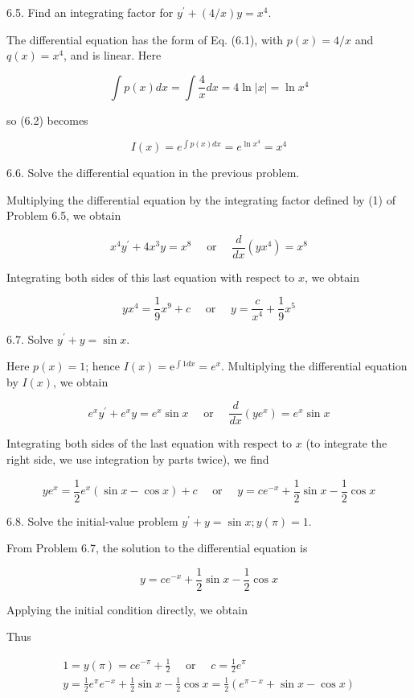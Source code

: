 \documentclass[10pt]{article}
\begin{document}
6.5. Find an integrating factor for $y^{\prime}+(4 / x) y=x^{4}$.

The differential equation has the form of Eq. (6.1), with $p(x)=4 / x$ and $q(x)=x^{4}$, and is linear. Here

$$
\int p(x) d x=\int \frac{4}{x} d x=4 \ln |x|=\ln x^{4}
$$

so (6.2) becomes


\begin{equation*}
I(x)=e^{\int p(x) d x}=e^{\ln x^{4}}=x^{4} \tag{1}
\end{equation*}


6.6. Solve the differential equation in the previous problem.

Multiplying the differential equation by the integrating factor defined by (1) of Problem 6.5, we obtain

$$
x^{4} y^{\prime}+4 x^{3} y=x^{8} \quad \text { or } \quad \frac{d}{d x}\left(y x^{4}\right)=x^{8}
$$

Integrating both sides of this last equation with respect to $x$, we obtain

$$
y x^{4}=\frac{1}{9} x^{9}+c \quad \text { or } \quad y=\frac{c}{x^{4}}+\frac{1}{9} x^{5}
$$

6.7. Solve $y^{\prime}+y=\sin x$.

Here $p(x)=1$; hence $I(x)=\mathrm{e}^{\int 1 d x}=e^{x}$. Multiplying the differential equation by $I(x)$, we obtain

$$
e^{x} y^{\prime}+e^{x} y=e^{x} \sin x \quad \text { or } \quad \frac{d}{d x}\left(y e^{x}\right)=e^{x} \sin x
$$

Integrating both sides of the last equation with respect to $x$ (to integrate the right side, we use integration by parts twice), we find

$$
y e^{x}=\frac{1}{2} e^{x}(\sin x-\cos x)+c \quad \text { or } \quad y=c e^{-x}+\frac{1}{2} \sin x-\frac{1}{2} \cos x
$$

6.8. Solve the initial-value problem $y^{\prime}+y=\sin x ; y(\pi)=1$.

From Problem 6.7, the solution to the differential equation is

$$
y=c e^{-x}+\frac{1}{2} \sin x-\frac{1}{2} \cos x
$$

Applying the initial condition directly, we obtain

Thus

$$
\begin{gathered}
1=y(\pi)=c e^{-\pi}+\frac{1}{2} \quad \text { or } \quad c=\frac{1}{2} e^{\pi} \\
y=\frac{1}{2} e^{\pi} e^{-x}+\frac{1}{2} \sin x-\frac{1}{2} \cos x=\frac{1}{2}\left(e^{\pi-x}+\sin x-\cos x\right)
\end{gathered}
$$
\end{document}
